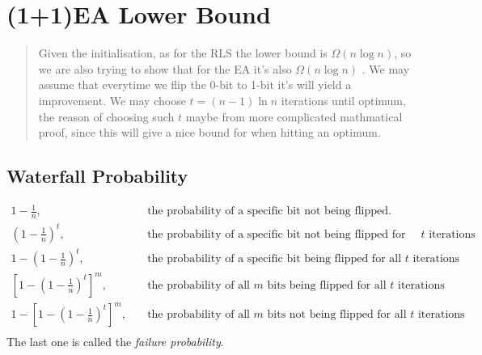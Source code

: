 \documentclass[a4paper, 12pt]{article}
\begin{document}
\section{(1+1)EA Lower Bound}
    \begin{quote}
        Given the initialisation, as for the RLS the lower bound is $\Omega(n\log n)$, so we are also trying to show that for the EA it's also $\Omega(n\log n)$
        . We may assume that everytime we flip the 0-bit to 1-bit it's will yield a improvement. We may choose $t=(n-1)\ln n$ iterations until optimum,
        the reason of choosing such $t$ maybe from more complicated mathmatical proof, since this will give a nice bound for when hitting an optimum.
    \end{quote}
    \subsection{Waterfall Probability}
        \begin{align*}
            1 - \frac{1}{n},&\quad\text{the probability of a specific bit not being flipped.}\\
            \left(1-\frac{1}{n}\right)^t,&\quad\text{the probability of a specific bit not being flipped for all } t \text{ iterations}\\
            1-\left(1-\frac{1}{n}\right)^t,&\quad\text{the probability of a specific bit being flipped for all } t \text{ iterations}\\
            \left[1-\left(1-\frac{1}{n}\right)^t\right]^m,&\quad\text{the probability of all $m$ bits being flipped for all } t \text{ iterations}\\
            1-\left[1-\left(1-\frac{1}{n}\right)^t\right]^m,&\quad\text{the probability of all $m$ bits not being flipped for all } t \text{ iterations}\\
        \end{align*}
        The last one is called the \emph{failure probability}.
\end{document}
